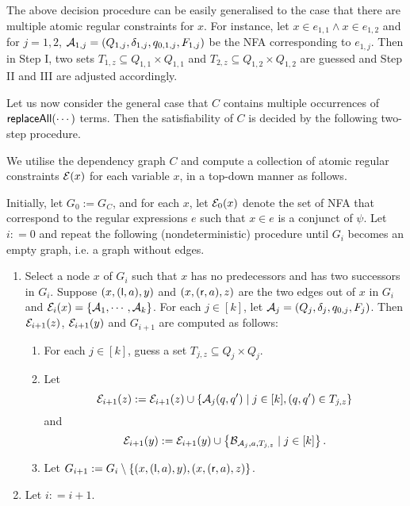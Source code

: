 The above decision procedure can be easily generalised to the case that there are multiple atomic regular constraints for $x$. For instance, let $x \in e_{1,1} \wedge x \in e_{1,2}$ and for $j = 1, 2$, $\mathcal{A}_{1,j} = (Q_{1,j}, \delta_{1, j}, q_{0,1, j}, F_{1,j})$ be 
the NFA corresponding to $e_{1,j}$. Then in Step I, two sets $T_{1,z} \subseteq Q_{1,1} \times Q_{1,1}$ and $T_{2,z} \subseteq Q_{1,2} \times Q_{1,2}$ are guessed and Step II and III are adjusted accordingly.

\begin{example}

\end{example}

Let us now consider the general case that $C$ contains multiple occurrences of $\mathsf{replaceAll}(\cdots)$ terms. 
Then the satisfiability of $C$ is decided by the following two-step procedure.

\smallskip

 We utilise the dependency graph $C$ and compute a collection of atomic regular constraints $\mathcal{E}(x)$ for each variable $x$, in a top-down manner as follows. 

Initially, let $G_0:= G_C$, and for each $x$, let $\mathcal{E}_0(x)$ denote the set of NFA that correspond to the regular expressions $e$ such that $x \in e$ is a conjunct of $\psi$. Let $i: = 0$ and repeat the following (nondeterministic) procedure until $G_i$ becomes an empty graph, i.e. a graph without edges. 

\begin{enumerate}
\item Select a node $x$ of $G_i$ such that $x$ has no predecessors and has two successors in $G_i$. Suppose $(x, (\mathsf{l}, a), y)$ and $(x, (\mathsf{r},a), z)$ are the two edges out of $x$ in $G_i$ and $\mathcal{E}_i(x)=\{\mathcal{A}_1,\cdots, \mathcal{A}_k\}$. For each $j \in [k]$, let $\mathcal{A}_j = (Q_j, \delta_j, q_{0,j}, F_j)$. Then $\mathcal{E}_{i+1}(z)$, $\mathcal{E}_{i+1}(y)$ and $G_{i+1}$ are computed as follows:  
\begin{enumerate}
\item For each $j \in [k]$, guess a set $T_{j, z} \subseteq Q_j \times Q_j$.
%
\item Let 
$$\mathcal{E}_{i+1}(z):= \mathcal{E}_{i+1}(z) \cup \left\{\mathcal{A}_j(q,q') \mid j \in [k], (q,q') \in T_{j,z} \right\}$$
and 
$$\mathcal{E}_{i+1}(y): = \mathcal{E}_{i+1}(y) \cup \left\{\mathcal{B}_{\mathcal{A}_j, a, T_{j,z}} \mid j \in [k] \right\}.$$
%
\item Let $G_{i+1}:= G_i \setminus \{(x, (\mathsf{l}, a), y), (x, (\mathsf{r},a), z)\}$.
\end{enumerate}
%
\item Let $i: = i+1$.
\end{enumerate}

